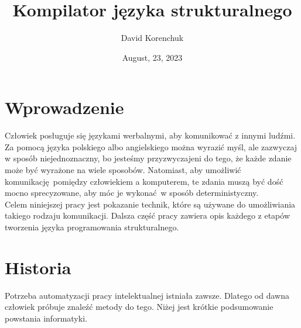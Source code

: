 \documentclass[leqno, 12pt]{article}
\title{Kompilator języka strukturalnego}
\author{David Korenchuk}
\date{August, 23, 2023}
\begin{document}
    \pagestyle{fancy}
    \lhead{\leftmark}
    \rhead{\thetitle}
    
    \setlength{\parindent}{0pt}

    \maketitle
    
    \newpage
    
    \tableofcontents

    \newpage
	
	
	\section{Wprowadzenie}
	
		Człowiek posługuje się językami werbalnymi, aby komunikować z innymi ludźmi. Za pomocą
		języka polskiego albo angielskiego można wyrazić myśl, ale zazwyczaj w sposób niejednoznaczny,
		bo jesteśmy przyzwyczajeni do tego, że każde zdanie może być wyrażone na wiele sposobów. Natomiast,
		aby umożliwić komunikację pomiędzy człowiekiem a komputerem, te zdania muszą być dość mocno
		sprecyzowane, aby móc je wykonać w sposób deterministyczny.
		\\
		
		Celem niniejszej pracy jest pokazanie technik, które są używane do umożliwiania takiego rodzaju
		komunikacji. Dalsza część pracy zawiera opis każdego z etapów tworzenia języka programowania
		strukturalnego. 

		\newpage
	
	\section{Historia}
		
		Potrzeba automatyzacji pracy intelektualnej istniała zawsze. Dlatego od dawna człowiek próbuje
		znaleźć metody do tego. Niżej jest krótkie podsumowanie powstania informatyki.
		\\
		
\end{document}
